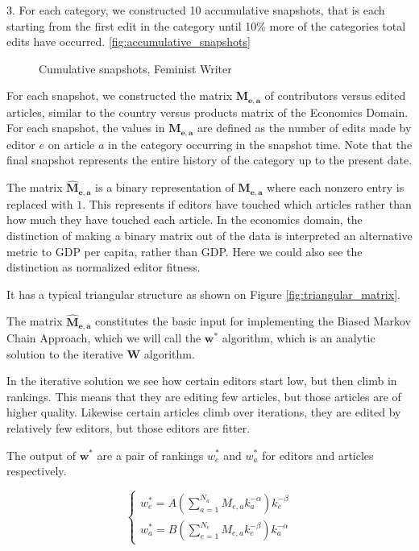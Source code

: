 \documentclass{acm_proc_article-sp}
\begin{document}
3. For each category, we constructed 10 accumulative snapshots, that is each starting from the first edit in the category until 10\% more of the categories total edits have occurred. \ref{fig:accumulative_snapshots}

\begin{figure}[!t]
\centering
\caption{Cumulative snapshots, Feminist Writer}
\label{fig:cumsnaps}
\end{figure}

 For each snapshot, we constructed the matrix $\mathbf{M_{e,a}}$ of contributors versus edited articles, similar to the country versus products matrix of the Economics Domain. For each snapshot, the values in $\mathbf{M_{e,a}}$ are defined as the number of edits made by editor $e$ on article $a$ in the category occurring in the snapshot time. Note that the final snapshot represents the entire history of the category up to the present date.


 
The matrix $\mathbf{\hat{M}_{e,a}}$ is a binary representation of $\mathbf{M_{e,a}}$ where each nonzero entry is replaced with $1$. This represents if editors have touched which articles rather than how much they have touched each article. In the economics domain, the distinction of making a binary matrix out of the data is interpreted an alternative metric to GDP per capita, rather than GDP. Here we could also see the distinction as normalized editor fitness.

It has a typical triangular structure as shown on Figure \ref{fig:triangular_matrix}.

The matrix $\mathbf{\hat{M}_{e,a}}$ constitutes the basic input for implementing the Biased Markov Chain Approach, which we will call the $\mathbf{w^*}$ algorithm, which is an analytic solution to the iterative $\mathbf{W}$ algorithm. \cite{Caldarelli} 

In the iterative solution we see how certain editors start low, but then climb in rankings. This means that they are editing few articles, but those articles are of higher quality. Likewise certain articles climb over iterations, they are edited by relatively few editors, but those editors are fitter.

The output of $\mathbf{w^*}$ are a pair of rankings $ w^*_e$ and $ w^*_a$ for editors and articles respectively.

\begin{equation}
\begin{cases}
w^*_e = A(\sum^{N_a}_{a=1} M_{e,a}k_a^{-\alpha})k_e^{-\beta} \\
w^*_a = B(\sum^{N_e}_{e=1} M_{e,a}k_e^{-\beta})k_a^{-\alpha}
\end{cases}
\end{equation}
\end{document}

